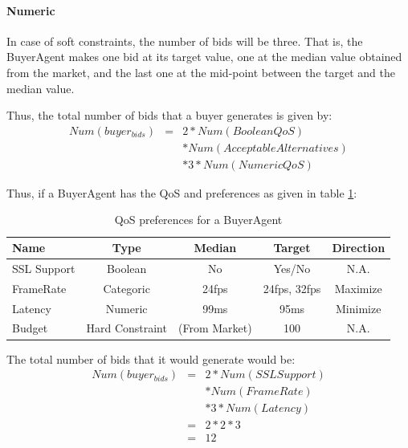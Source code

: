 \documentclass[10pt,journal,compsoc]{IEEEtran}
\begin{document}
\paragraph{Numeric} In case of soft constraints, the number of bids will be three. That is, the BuyerAgent makes one bid at its target value, one at the median value obtained from the market, and the last one at the mid-point between the target and the median value.

Thus, the total number of bids that a buyer generates is given by:
\setlength{\arraycolsep}{0.0em}
\begin{eqnarray}
Num(buyer_{bids})&{} = &{ }2 * Num(BooleanQoS)\nonumber\\
						  && *{ }  Num(AcceptableAlternatives)\nonumber\\
						  && *{ } 3 * Num(NumericQoS)
\end{eqnarray}
\setlength{\arraycolsep}{5pt}

Thus, if a BuyerAgent has the QoS and preferences as given in table \ref{tbl:sample_qos_preferences}:

\begin{table}
\centering
\begin{tabular}{lcccc}
\toprule
\textbf{Name} & \textbf{Type} & \textbf{Median} & \textbf{Target} & \textbf{Direction} \\ 
\midrule
SSL Support & Boolean & No & Yes/No & N.A. \\ 
FrameRate & Categoric & 24fps & 24fps, 32fps & Maximize \\ 
Latency & Numeric & 99ms & 95ms	& Minimize \\ 
Budget & Hard Constraint & (From Market) &  100 & N.A. \\ 
\bottomrule
\end{tabular}
\caption{QoS preferences for a BuyerAgent \label{tbl:sample_qos_preferences}}
\end{table}

The total number of bids that it would generate would be:
\begin{eqnarray} \label{eqn:num_generated_bids}
Num(buyer_{bids}) &=& 2 * Num(SSL Support)\nonumber\\
					&&  * Num(FrameRate)\nonumber\\
					&& 	* 3 * Num(Latency)\nonumber \\
		            &=& 2 * 2 * 3  \nonumber \\
        		    &=& 12 \nonumber
\end{eqnarray}
\end{document}

